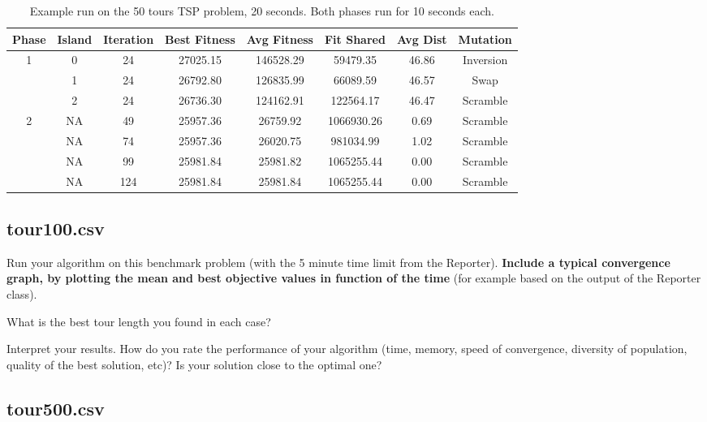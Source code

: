 \documentclass[a4paper,10pt]{article}
\newcommand{\ReplaceMe}[1]{{\color{blue}#1}}
\begin{document}
{	
\begin{table}[ht]
	\centering
	\begin{tabular}{|c|c|c|c|c|c|c|c|}
		\hline
		\textbf{Phase} & \textbf{Island} & \textbf{Iteration} & \textbf{Best Fitness} & \textbf{Avg Fitness} & \textbf{Fit Shared} & \textbf{Avg Dist} & \textbf{Mutation} \\
		\hline
		\multirow{3}{*}{1} & 0 & 24 & 27025.15 & 146528.29 & 59479.35 & 46.86 & Inversion\\
		& 1 & 24 & 26792.80 & 126835.99 & 66089.59 & 46.57 & Swap \\
		& 2 & 24 & 26736.30 & 124162.91 & 122564.17 & 46.47 & Scramble\\
		\hline
		\multirow{4}{*}{2} & NA & 49 & 25957.36 & 26759.92 & 1066930.26 & 0.69 & Scramble\\
		& NA & 74 & 25957.36 & 26020.75 & 981034.99 & 1.02 & Scramble \\
		& NA & 99 & 25981.84 & 25981.82 & 1065255.44 & 0.00 & Scramble\\
		& NA & 124 & 25981.84 & 25981.84 & 1065255.44 & 0.00 & Scramble\\
		\hline
	\end{tabular}
	\caption{Example run on the 50 tours TSP problem, 20 seconds. Both phases run for 10 seconds each.}
\end{table}
	
	



}
\subsection{tour100.csv}\label{sec_shorttour}

\ReplaceMe{Run your algorithm on this benchmark problem (with the 5 minute time limit from the Reporter). \textbf{Include a typical convergence graph, by plotting the mean and best objective values in function of the time} (for example based on the output of the Reporter class).

What is the best tour length you found in each case? 

Interpret your results. How do you rate the performance of your algorithm (time, memory, speed of convergence, diversity of population, quality of the best solution, etc)? Is your solution close to the optimal one?}

\subsection{tour500.csv}
\end{document}
